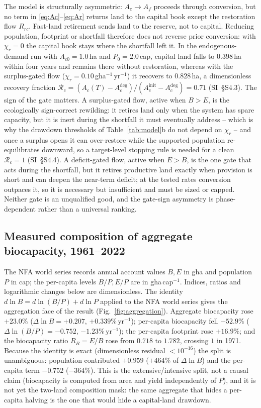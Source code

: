 The model is structurally asymmetric: $A_c\to A_f$ proceeds through conversion, but no term in \eqref{eq:Ac}--\eqref{eq:Ar} returns land to the capital book except the restoration flow $R_{rc}$. Fast-land retirement sends land to the reserve, not to capital. Reducing population, footprint or shortfall therefore does not reverse prior conversion: with $\chi_r=0$ the capital book stays where the shortfall left it. In the endogenous-demand run with $A_{c0}=1.0$\,ha and $P_0=2.0$\,cap, capital land falls to $0.398$\,ha within four years and remains there without restoration, whereas with the surplus-gated flow ($\chi_r=0.10$\,gha$^{-1}$\,yr$^{-1}$) it recovers to $0.828$\,ha, a dimensionless recovery fraction $\mathcal R_c=(A_c(T)-A_c^{\mathrm{deg}})/(A_c^{\mathrm{init}}-A_c^{\mathrm{deg}})=0.71$ (SI~\S S4.3). The sign of the gate matters. A surplus-gated flow, active when $B>E$, is the ecologically sign-correct rewilding: it retires land only when the system has spare capacity, but it is inert during the shortfall it must eventually address -- which is why the drawdown thresholds of Table~\ref{tab:model}b do not depend on $\chi_r$ -- and once a surplus opens it can over-restore while the supported population re-equilibrates downward, so a target-level stopping rule is needed for a clean $\mathcal R_c=1$ (SI~\S S4.4). A deficit-gated flow, active when $E>B$, is the one gate that acts during the shortfall, but it retires productive land exactly when provision is short and can deepen the near-term deficit; at the tested rates conversion outpaces it, so it is necessary but insufficient and must be sized or capped. Neither gate is an unqualified good, and the gate-sign asymmetry is phase-dependent rather than a universal ranking.

\subsection{Measured composition of aggregate biocapacity, 1961--2022}\label{sec:empirical}

The NFA world series records annual account values $B,E$ in gha and population $P$ in cap; the per-capita levels $B/P,E/P$ are in gha\,cap$^{-1}$. Indices, ratios and logarithmic changes below are dimensionless. The identity $d\ln B=d\ln(B/P)+d\ln P$ applied to the NFA world series gives the aggregation face of the result (Fig.~\ref{fig:aggregation}). Aggregate biocapacity rose $+23.0\%$ ($\Delta\ln B=+0.207$, $+0.339\%\,\mathrm{yr}^{-1}$); per-capita biocapacity fell $-52.9\%$ ($\Delta\ln(B/P)=-0.752$, $-1.23\%\,\mathrm{yr}^{-1}$); the per-capita footprint rose $+16.9\%$; and the biocapacity ratio $R_B=E/B$ rose from $0.718$ to $1.782$, crossing $1$ in 1971. Because the identity is exact (dimensionless residual $<10^{-16}$) the split is unambiguous: population contributed $+0.959$ ($+464\%$ of $\Delta\ln B$) and the per-capita term $-0.752$ ($-364\%$). This is the extensive/intensive split, not a causal claim (biocapacity is computed from area and yield independently of $P$), and it is not yet the two-land composition mask: the same aggregate that hides a per-capita halving is the one that would hide a capital-land drawdown.

